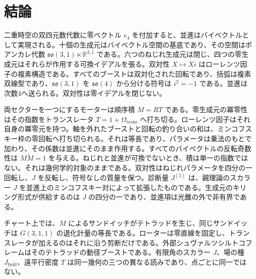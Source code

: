 \documentclass[a4paper]{article}
\begin{document}
\section{結論}
\label{sec:conclusions}

二重時空の双四元数代数に零ベクトル \(e_{4}\) を付加すると、並進はバイベクトルとして実現される。十個の生成元はバイベクトル空間の基底であり、その空間はポアンカレ代数 \(\mathfrak{so}(3,1)\ltimes\mathbb{R}^{3,1}\) である。六つのねじれ生成元は閉じ、四つの零生成元はそれらが作用する可換イデアルを張る。双対性 \(X\mapsto Xi\) はローレンツ因子の複素構造である。すべてのブーストは双対化された回転であり、括弧は複素双線型であり、\(\mathfrak{so}(3,1)\) を \(\mathfrak{so}(4)\) から分ける符号は \(i^{2}=-1\) である。並進は次数4へ送られる。双対性は零イデアルを閉じない。

両セクターを一つにするモーターは順序積 \(M=RT\) である。零生成元の冪零性はその指数をトランスレータ \(T=1+\Omega_{\mathrm{trans}}\) へ打ち切る。ローレンツ因子はそれ自身の冪零元を持つ。軸を外れたブーストと回転の釣り合いの和は、ミンコフスキー枠の零回転へ打ち切られる。それは等長であり、パラメータは乗法のもとで加わり、その係数は並進にそのまま作用する。すべてのバイベクトルの反転奇数性は \(M\widetilde{M}=1\) を与える。ねじれと並進が可換でないとき、積は単一の指数ではない。それは幾何学的対象のままである。双対性はねじれパラメータを四分の一回転し、\(J\) を反転し、符号なしの質量を保つ。診断量 \(J^{(5)}\) は、親理論のスカラー \(J\) を並進上のミンコフスキー対によって拡張したものである。生成元のキリング形式が供給するのは \(J\) の四分の一であり、並進項は光錐の外で非有界である。

チャート上では、\(M\) によるサンドイッチがテトラッドを生じ、同じサンドイッチは \(G(3,1,1)\) の退化計量の等長である。ローターは零直線を固定し、トランスレータが加えるのはそれに沿う剪断だけである。外部シュヴァルツシルトコフレームはそのテトラッドの動径ブーストである。有限角のスカラー \(J\)、場の種 \(J_{\mathrm{field}}\)、遠平行密度 \(T\) は同一幾何の三つの異なる読みであり、点ごとに同一ではない。
\end{document}
